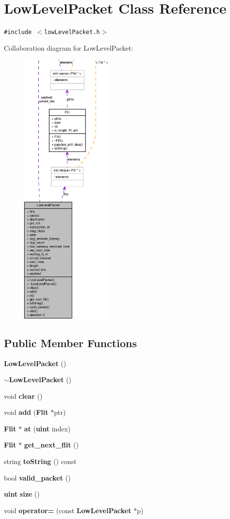 \section{LowLevelPacket Class Reference}
\label{classLowLevelPacket}
{\tt \#include $<$lowLevelPacket.h$>$}

Collaboration diagram for LowLevelPacket:\nopagebreak
\begin{figure}[H]
\begin{center}
\leavevmode
\includegraphics[height=400pt]{classLowLevelPacket__coll__graph}
\end{center}
\end{figure}
\subsection*{Public Member Functions}
\begin{CompactItemize}
\item 
{\bf LowLevelPacket} ()
\item 
{\bf $\sim$LowLevelPacket} ()
\item 
void {\bf clear} ()
\item 
void {\bf add} ({\bf Flit} $\ast$ptr)
\item 
{\bf Flit} $\ast$ {\bf at} ({\bf uint} index)
\item 
{\bf Flit} $\ast$ {\bf get\_\-next\_\-flit} ()
\item 
string {\bf toString} () const 
\item 
bool {\bf valid\_\-packet} ()
\item 
{\bf uint} {\bf size} ()
\item 
void {\bf operator=} (const {\bf LowLevelPacket} $\ast$p)
\end{CompactItemize}
